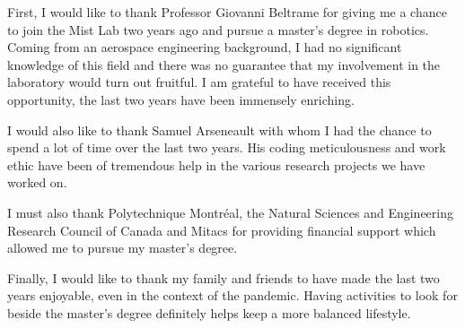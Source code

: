 %
%

First, I would like to thank Professor Giovanni Beltrame for giving me a chance to join the Mist Lab two years ago and pursue a master's degree in robotics. Coming from an aerospace engineering background, I had no significant knowledge of this field and there was no guarantee that my involvement in the laboratory would turn out fruitful. I am grateful to have received this opportunity, the last two years have been immensely enriching.

I would also like to thank Samuel Arseneault with whom I had the chance to spend a lot of time over the last two years. His coding meticulousness and work ethic have been of tremendous help in the various research projects we have worked on.

I must also thank Polytechnique Montréal, the Natural Sciences and Engineering Research Council of Canada and Mitacs for providing financial support which allowed me to pursue my master's degree.

Finally, I would like to thank my family and friends to have made the last two years enjoyable, even in the context of the pandemic. Having activities to look for beside the master's degree definitely helps keep a more balanced lifestyle.
